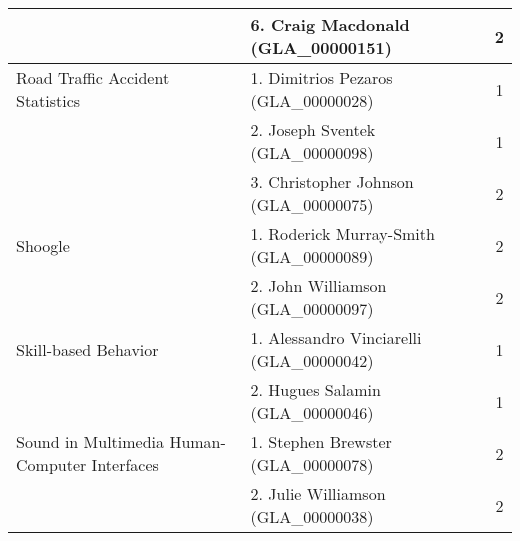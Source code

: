 \begin{longtable}{|l|l|c|}
\hline  & 6. Craig Macdonald (GLA\_00000151) & 2 \\ 
\hline Road Traffic Accident Statistics & 1. Dimitrios Pezaros (GLA\_00000028) & 1 \\ 
\hline  & 2. Joseph Sventek (GLA\_00000098) & 1 \\ 
\hline  & 3. Christopher Johnson (GLA\_00000075) & 2 \\ 
\hline Shoogle & 1. Roderick Murray-Smith (GLA\_00000089) & 2 \\ 
\hline  & 2. John Williamson (GLA\_00000097) & 2 \\ 
\hline Skill-based Behavior & 1. Alessandro Vinciarelli (GLA\_00000042) & 1 \\ 
\hline  & 2. Hugues Salamin (GLA\_00000046) & 1 \\ 
\hline Sound in Multimedia Human-Computer Interfaces & 1. Stephen Brewster (GLA\_00000078) & 2  \\ 
\hline  & 2. Julie Williamson (GLA\_00000038) & 2 \\ 


\end{longtable}
